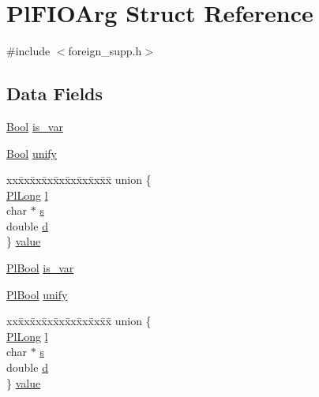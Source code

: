 \hypertarget{structPlFIOArg}{}\section{Pl\+F\+I\+O\+Arg Struct Reference}
\label{structPlFIOArg}


{\ttfamily \#include $<$foreign\+\_\+supp.\+h$>$}

\subsection*{Data Fields}
\begin{DoxyCompactItemize}
\item 
\hyperlink{bool_8h_afdcfe6db5bea87bd493a3fe2c513d5ef}{Bool} \hyperlink{structPlFIOArg_ad700005317887006bd276a4d1a177881}{is\+\_\+var}
\item 
\hyperlink{bool_8h_afdcfe6db5bea87bd493a3fe2c513d5ef}{Bool} \hyperlink{structPlFIOArg_a6394f30ef4d8a74b9a1e731a9f725a35}{unify}
\item 
\begin{tabbing}
xx\=xx\=xx\=xx\=xx\=xx\=xx\=xx\=xx\=\kill
union \{\\
\>\hyperlink{gprolog_8h_a4d005b136d7fb28537eb1815f7868b63}{PlLong} \hyperlink{structPlFIOArg_aa3defe5b9b337af219dc900c1002c415}{l}\\
\>char $\ast$ \hyperlink{structPlFIOArg_a35d13654b0af31ea91e470fcaf0ae260}{s}\\
\>double \hyperlink{structPlFIOArg_a57da0f30aca68fa0d1d4e06a25b563c2}{d}\\
\} \hyperlink{structPlFIOArg_a69180a58f761dcda790af38c4c0ca5a2}{value}\\

\end{tabbing}\item 
\hyperlink{foreign__supp_8h_a657a11db660992b5ffe24a48f8a67925}{Pl\+Bool} \hyperlink{structPlFIOArg_ab4d9b51a4575a50e1d9b8a3ec36a3f6e}{is\+\_\+var}
\item 
\hyperlink{foreign__supp_8h_a657a11db660992b5ffe24a48f8a67925}{Pl\+Bool} \hyperlink{structPlFIOArg_a3d5c4af7de4d733aa3806b29081336b8}{unify}
\item 
\begin{tabbing}
xx\=xx\=xx\=xx\=xx\=xx\=xx\=xx\=xx\=\kill
union \{\\
\>\hyperlink{gprolog_8h_a4d005b136d7fb28537eb1815f7868b63}{PlLong} \hyperlink{structPlFIOArg_aa3defe5b9b337af219dc900c1002c415}{l}\\
\>char $\ast$ \hyperlink{structPlFIOArg_a35d13654b0af31ea91e470fcaf0ae260}{s}\\
\>double \hyperlink{structPlFIOArg_a57da0f30aca68fa0d1d4e06a25b563c2}{d}\\
\} \hyperlink{structPlFIOArg_a1588d26dbc95302b6b7a0b79715ead8e}{value}\\

\end{tabbing}\end{DoxyCompactItemize}


